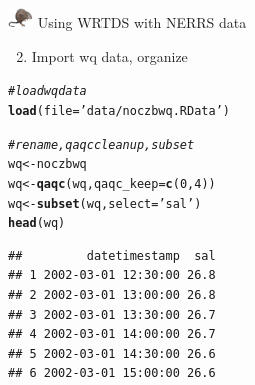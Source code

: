 \documentclass[xcolor=dvipsnames,serif]{beamer}\usepackage[]{graphicx}\usepackage[]{color}
\makeatletter
\newcommand{\hlnum}[1]{\textcolor[rgb]{0.686,0.059,0.569}{#1}}%
\newcommand{\hlstr}[1]{\textcolor[rgb]{0.192,0.494,0.8}{#1}}%
\newcommand{\hlcom}[1]{\textcolor[rgb]{0.678,0.584,0.686}{\textit{#1}}}%
\newcommand{\hlstd}[1]{\textcolor[rgb]{0.345,0.345,0.345}{#1}}%
\newcommand{\hlkwb}[1]{\textcolor[rgb]{0.69,0.353,0.396}{#1}}%
\newcommand{\hlkwc}[1]{\textcolor[rgb]{0.333,0.667,0.333}{#1}}%
\newcommand{\hlkwd}[1]{\textcolor[rgb]{0.737,0.353,0.396}{\textbf{#1}}}%
\newenvironment{kframe}{%
 \def\at@end@of@kframe{}%
 \ifinner\ifhmode%
  \def\at@end@of@kframe{\end{minipage}}%
  \begin{minipage}{\columnwidth}%
 \fi\fi%
 \def\FrameCommand##1{\hskip\@totalleftmargin \hskip-\fboxsep
 \colorbox{shadecolor}{##1}\hskip-\fboxsep
     \hskip-\linewidth \hskip-\@totalleftmargin \hskip\columnwidth}%
 \MakeFramed {\advance\hsize-\width
   \@totalleftmargin\z@ \linewidth\hsize
   \@setminipage}}%
 {\par\unskip\endMakeFramed%
 \at@end@of@kframe}
\newenvironment{knitrout}{}{} %
\makeatother
\begin{document}
\begin{frame}[t, fragile]{\includegraphics[width = 0.05\textwidth]{imgs/swmprat.png} Using WRTDS with NERRS data}{}
\begin{enumerate}
\setcounter{enumi}{1}
\item<1-> Import wq data, organize
\end{enumerate}
\begin{knitrout}\scriptsize
{}\color{fgcolor}\begin{kframe}
\begin{alltt}
\hlcom{# load wq data}
\hlkwd{load}\hlstd{(}\hlkwc{file} \hlstd{=} \hlstr{'data/noczbwq.RData'}\hlstd{)}

\hlcom{# rename, qaqc clean up, subset}
\hlstd{wq} \hlkwb{<-} \hlstd{noczbwq}
\hlstd{wq} \hlkwb{<-} \hlkwd{qaqc}\hlstd{(wq,} \hlkwc{qaqc_keep} \hlstd{=} \hlkwd{c}\hlstd{(}\hlnum{0}\hlstd{,} \hlnum{4}\hlstd{))}
\hlstd{wq} \hlkwb{<-} \hlkwd{subset}\hlstd{(wq,} \hlkwc{select} \hlstd{=} \hlstr{'sal'}\hlstd{)}
\hlkwd{head}\hlstd{(wq)}
\end{alltt}
\begin{verbatim}
##         datetimestamp  sal
## 1 2002-03-01 12:30:00 26.8
## 2 2002-03-01 13:00:00 26.8
## 3 2002-03-01 13:30:00 26.7
## 4 2002-03-01 14:00:00 26.7
## 5 2002-03-01 14:30:00 26.6
## 6 2002-03-01 15:00:00 26.6
\end{verbatim}
\end{kframe}
\end{knitrout}
\end{frame}
\end{document}
